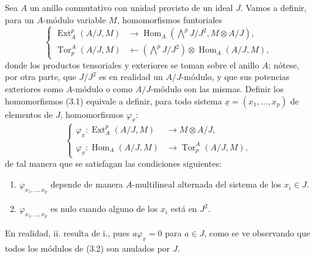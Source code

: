 
Sea $A$ un anillo conmutativo con unidad provisto de un ideal $J$. Vamos a
definir, para un $A$-módulo variable $M$, homomorfismos funtoriales
\begin{equation}\tag{3.1}
\left\{
\begin{aligned}
\operatorname{Ext}_{A}^{p}(A/J,M)
  &\longrightarrow
  \operatorname{Hom}_{A}\!\left(\bigwedge^{p}J/J^{2},M\otimes A/J\right),\\
\operatorname{Tor}_{p}^{A}(A/J,M)
  &\longleftarrow
  \left(\bigwedge^{p}J/J^{2}\right)
  \otimes\operatorname{Hom}_{A}(A/J,M),
\end{aligned}
\right.
\end{equation}
donde los productos tensoriales y exteriores se toman sobre el anillo $A$; nótese,
por otra parte, que $J/J^{2}$ es en realidad un $A/J$-módulo, y que sus potencias
exteriores como $A$-módulo o como $A/J$-módulo son las mismas.
Definir los homomorfismos (3.1) equivale a definir, para todo
sistema $\underline{x}=(x_1,\ldots,x_p)$ de elementos de $J$, homomorfismos
$\varphi_{\underline{x}}$:
\begin{equation}\tag{3.2}
\left\{
\begin{aligned}
\varphi_{\underline{x}}:
  \operatorname{Ext}_{A}^{p}(A/J,M)&\longrightarrow M\otimes A/J,\\
\varphi_{\underline{x}}:
  \operatorname{Hom}_{A}(A/J,M)&\longrightarrow
  \operatorname{Tor}_{p}^{A}(A/J,M),
\end{aligned}
\right.
\end{equation}
de tal manera que se satisfagan las condiciones siguientes:

\begin{enumerate}
\item[\textup{i.}] $\varphi_{x_1,\ldots,x_p}$ depende de manera
$A$-multilineal alternada del sistema de los $x_i\in J$.
\item[\textup{ii.}] $\varphi_{x_1,\ldots,x_p}$ es nulo cuando alguno de los $x_i$ está
en $J^{2}$.
\end{enumerate}
En realidad, ii. resulta de i., pues $a\varphi_{\underline{x}}=0$ para $a\in J$,
como se ve observando que todos los módulos de (3.2) son anulados por
$J$.

